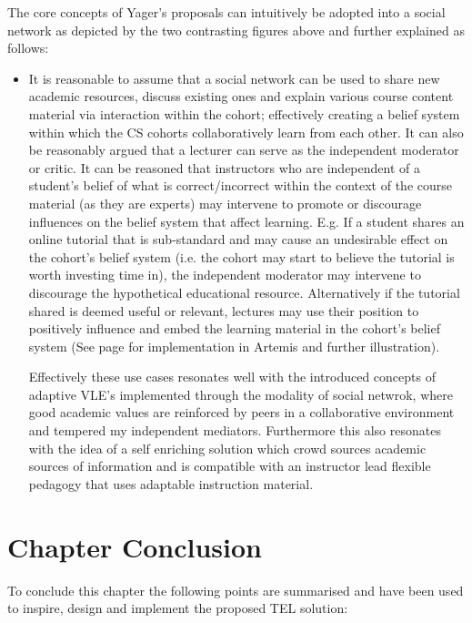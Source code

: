 \begin{itemize}[\null]
    The core concepts of Yager's proposals can intuitively be adopted into a social network as depicted by the two contrasting figures above and further explained as follows:
    \begin{itemize}
        \item It is reasonable to assume that a social network can be used to share new academic resources, discuss existing ones and explain various course content material via interaction within the cohort; effectively creating a belief system within which the CS cohorts collaboratively learn from each other. It can also be reasonably argued that a lecturer can serve as the independent moderator or critic. It can be reasoned that instructors who are independent of a student's belief of what is correct/incorrect within the context of the course material (as they are experts) may intervene to promote or discourage influences on the belief system that affect learning. E.g. If a student shares an online tutorial that is sub-standard and may cause an undesirable effect on the cohort's belief system (i.e. the cohort may start to believe the tutorial is worth investing time in), the independent moderator may intervene to discourage the hypothetical educational resource. Alternatively if the tutorial shared is deemed useful or relevant, lectures may use their position to positively influence and embed the learning material in the cohort's belief system (See page \textbf{\pageref{fig:UseCaseParticipatory}} for implementation in Artemis and further illustration).
        
        Effectively these use cases resonates well with the introduced concepts of adaptive VLE's implemented through the modality of social netwrok, where good academic values are reinforced by peers in a collaborative environment and tempered my independent mediators. Furthermore this also resonates with the idea of a self enriching solution which crowd sources academic sources of information and is compatible with an instructor lead flexible pedagogy that uses adaptable instruction material.
    \end{itemize}
    

    
    \end{itemize}
    
\section{Chapter Conclusion}

To conclude this chapter the following points are summarised and have been used to inspire, design and implement the proposed TEL solution:

